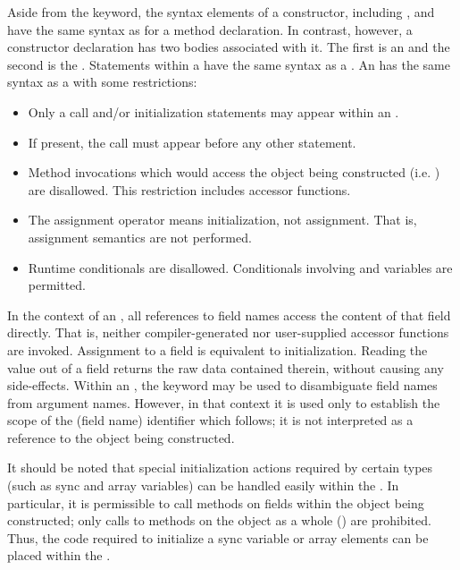 Aside from the  keyword, the syntax elements of a constructor,
including ,  and 
have the same syntax as for a method declaration.  In contrast, however,
a constructor declaration has two bodies associated with it.  The first is
an  and the second is the .
Statements within a  have the same syntax as
a . An  has the same syntax as
a  with some restrictions:
\begin{itemize}
\item Only a  call and/or initialization statements
may appear within an .
\item If present, the  call must appear before any other statement.
\item Method invocations which would
access the object being constructed (i.e. ) are disallowed.  This
restriction includes accessor functions.  
\item The assignment operator \chpl{=} means initialization, not assignment.
That is, assignment semantics are not performed.
\item Runtime conditionals are disallowed.  Conditionals involving 
and  variables are permitted.
\end{itemize}
\noindent
In the context of an
, all references to field names access the content
of that field directly.  That is, neither compiler-generated nor user-supplied
accessor functions are invoked.  Assignment to a field is equivalent to
initialization.  Reading the value out of a field returns the raw data contained
therein, without causing any side-effects.  Within
an , the  keyword may be used to
disambiguate field names from argument names.  However, in that context it is used
only to establish the scope of the (field name) identifier which follows; it is
not interpreted as a reference to the object being constructed.

It should be noted that special initialization actions required by certain types
(such as sync and array variables) can be handled easily within
the .  In particular, it is permissible to call
methods on fields within the object being constructed; only calls to methods on
the object as a whole () are prohibited.  Thus, the code required to
initialize a sync variable or array elements can be placed within the
.

